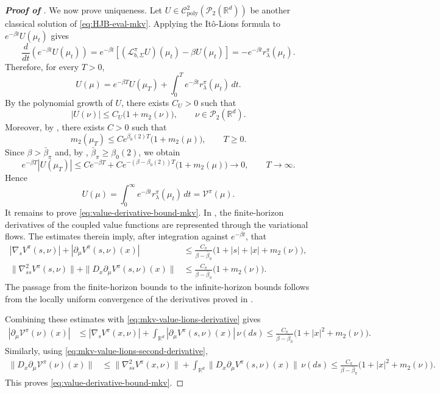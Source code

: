 \documentclass[a4paper, 10pt, english, reqno]{amsart}
\begin{document}
\begin{proof}[\textbf{Proof of }]
We now prove uniqueness. Let
$U\in\mathcal C^2_{\mathrm{poly}}(\mathcal P_2(\mathbb R^d))$ be
another classical solution of \eqref{eq:HJB-eval-mkv}. Applying the
It\^o-Lions formula to $e^{-\beta t}U(\mu_t)$ gives
\[
  \frac{d}{dt}
  \left(e^{-\beta t}U(\mu_t)\right)
  =
  e^{-\beta t}
  \left[
    (\mathcal L_{b,\Sigma}^{\pi}U)(\mu_t)
    -
    \beta U(\mu_t)
  \right]
  =
  -e^{-\beta t}r_\lambda^\pi(\mu_t).
\]
Therefore, for every $T>0$,
\[
  U(\mu)
  =
  e^{-\beta T}U(\mu_T)
  +
  \int_0^T e^{-\beta t}r_\lambda^\pi(\mu_t)\,dt.
\]
By the polynomial growth of $U$, there exists $C_U>0$ such that
\[
  |U(\nu)|\le C_U\bigl(1+m_2(\nu)\bigr),
  \qquad \nu\in\mathcal P_2(\mathbb R^d).
\]
Moreover, by \cite[Lemma A.1 with $p=2$]{firstpaper}, there exists
$C>0$ such that
\[
  m_2(\mu_T)\le C e^{\beta_0(2)T}\bigl(1+m_2(\mu)\bigr),
  \qquad T\ge0.
\]
Since $\beta>\bar\beta_\pi$ and, by \cite[Remark 3.4]{firstpaper},
$\bar\beta_\pi\ge \beta_0(2)$, we obtain
\[
  e^{-\beta T}|U(\mu_T)|
  \le
  C e^{-\beta T}
  +
  C e^{-(\beta-\beta_0(2))T}\bigl(1+m_2(\mu)\bigr)
  \longrightarrow 0,
  \qquad T\to\infty.
\]
Hence
\[
  U(\mu)
  =
  \int_0^\infty e^{-\beta t}r_\lambda^\pi(\mu_t)\,dt
  =
  \mathcal V^\pi(\mu).
\]
It remains to prove \eqref{eq:value-derivative-bound-mkv}. In
\cite[Step 3 of the proof of Theorem 3.3]{firstpaper},
the finite-horizon derivatives of the coupled value functions are
represented through the variational flows. The estimates \cite[(71)-(72)]{firstpaper} therein imply,
after integration against $e^{-\beta t}$, that
\[
\begin{aligned}
  |\nabla_sV^\pi(s,\nu)|
  +
  |\partial_\mu V^\pi(s,\nu)(x)|
  &\le
  \frac{C_\pi}{\beta-\bar\beta_\pi}
  \bigl(1+|s|+|x|+m_2(\nu)\bigr),                                  \\
  \|\nabla^2_{ss}V^\pi(s,\nu)\|
  +
  \|D_x\partial_\mu V^\pi(s,\nu)(x)\|
  &\le
  \frac{C_\pi}{\beta-\bar\beta_\pi}
  \bigl(1+m_2(\nu)\bigr).
\end{aligned}
\]
The passage from the finite-horizon bounds to the infinite-horizon
bounds follows from the locally uniform convergence of the derivatives
proved in \cite[Step 4 of the proof of Theorem 3.3]
{firstpaper}.

Combining these estimates with
\eqref{eq:mkv-value-lions-derivative} gives
\[
\begin{aligned}
  |\partial_\mu\mathcal V^\pi(\nu)(x)|
  &\le
  |\nabla_sV^\pi(x,\nu)|
  +
  \int_{\mathbb R^d}
  |\partial_\mu V^\pi(s,\nu)(x)|\,\nu(ds)\le
  \frac{C_\pi}{\beta-\bar\beta_\pi}
  \bigl(1+|x|^2+m_2(\nu)\bigr).
\end{aligned}
\]
Similarly, using \eqref{eq:mkv-value-lions-second-derivative},
\[
\begin{aligned}
  \|D_x\partial_\mu\mathcal V^\pi(\nu)(x)\|
  &\le
  \|\nabla^2_{ss}V^\pi(x,\nu)\|
  +
  \int_{\mathbb R^d}
  \|D_x\partial_\mu V^\pi(s,\nu)(x)\|\,\nu(ds)     \le
  \frac{C_\pi}{\beta-\bar\beta_\pi}
  \bigl(1+|x|^2+m_2(\nu)\bigr).
\end{aligned}
\]
This proves \eqref{eq:value-derivative-bound-mkv}.
\end{proof}
\end{document}
